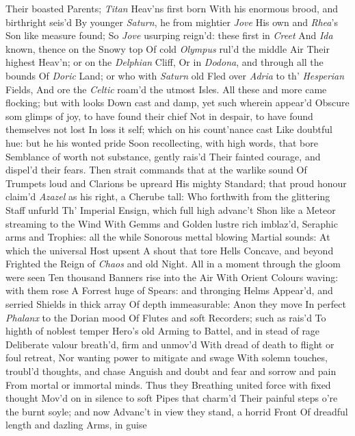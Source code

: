 \documentclass[11pt]{book}
\newcounter {first}
\begin{document}
Their boasted Parents; \textit{Titan} Heav'ns first born 
With his enormous brood, and birthright seis'd 
By younger \textit{Saturn}, he from mightier \textit{Jove} 
His own and \textit{Rhea}'s Son like measure found; 
So \textit{Jove} usurping reign'd: these first in \textit{Creet} 
And \textit{Ida} known, thence on the Snowy top 
Of cold \textit{Olympus} rul'd the middle Air 
Their highest Heav'n; or on the \textit{Delphian} Cliff, 
Or in \textit{Dodona}, and through all the bounds 
Of \textit{Doric} Land; or who with \textit{Saturn} old 
Fled over \textit{Adria} to th' \textit{Hesperian} Fields, 
And ore the \textit{Celtic} roam'd the utmost Isles. 
All these and more came flocking; but with looks 
Down cast and damp, yet such wherein appear'd 
Obscure som glimps of joy, to have found their chief 
Not in despair, to have found themselves not lost 
In loss it self; which on his count'nance cast 
Like doubtful hue: but he his wonted pride 
Soon recollecting, with high words, that bore 
Semblance of worth not substance, gently rais'd 
Their fainted courage, and dispel'd their fears. 
Then strait commands that at the warlike sound 
Of Trumpets loud and Clarions be upreard 
His mighty Standard; that proud honour claim'd 
\textit{Azazel} as his right, a Cherube tall: 
Who forthwith from the glittering Staff unfurld 
Th' Imperial Ensign, which full high advanc't 
Shon like a Meteor streaming to the Wind 
With Gemms and Golden lustre rich imblaz'd, 
Seraphic arms and Trophies: all the while 
Sonorous mettal blowing Martial sounds: 
At which the universal Host upsent 
A shout that tore Hells Concave, and beyond 
Frighted the Reign of \textit{Chaos} and old Night. 
All in a moment through the gloom were seen 
Ten thousand Banners rise into the Air 
With Orient Colours waving: with them rose 
A Forrest huge of Spears: and thronging Helms 
Appear'd, and serried Shields in thick array 
Of depth immeasurable: Anon they move 
In perfect \textit{Phalanx} to the Dorian mood 
Of Flutes and soft Recorders; such as rais'd 
To highth of noblest temper Hero's old 
Arming to Battel, and in stead of rage 
Deliberate valour breath'd, firm and unmov'd 
With dread of death to flight or foul retreat, 
Nor wanting power to mitigate and swage 
With solemn touches, troubl'd thoughts, and chase 
Anguish and doubt and fear and sorrow and pain 
From mortal or immortal minds.  Thus they 
Breathing united force with fixed thought 
Mov'd on in silence to soft Pipes that charm'd 
Their painful steps o're the burnt soyle; and now 
Advanc't in view they stand, a horrid Front 
Of dreadful length and dazling Arms, in guise 
\end{document}
